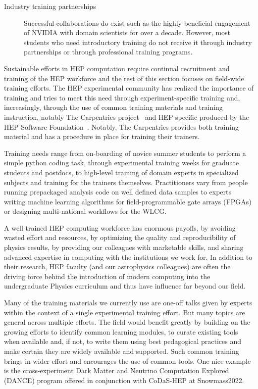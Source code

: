 \begin{description}
  \item [Industry training partnerships] Successful collaborations do exist such as the highly beneficial engagement of NVIDIA with domain scientists for over a decade.  However, most students who need introductory training do not receive it through industry partnerships or through professional training programs.   
\end{description}

\begin{comment}
    We need to make an effort to find the underlying challenges so that together we can address R\&D challenges in diverse teams. 
\end{comment}

Sustainable efforts in HEP computation require continual recruitment and training of  the HEP workforce and the rest of this section focuses on field-wide training efforts. The HEP experimental community has realized the importance of training and tries to meet this need through experiment-specific training and, increasingly, through the use of common training materials and training instruction, notably The Carpentries project~\cite{Carpentries} and HEP specific produced by the HEP Software Foundation~\cite{Malik_2021}.  Notably, The Carpentries provides both training material and has a procedure in place for training their trainers.

Training needs range from on-boarding of novice summer students to perform a simple python coding task, through experimental training weeks for graduate students and postdocs, to high-level training of domain experts in specialized subjects and training for the trainers themselves. Practitioners vary from people running prepackaged analysis code on well defined data samples to experts writing machine learning algorithms for field-programmable gate arrays (FPGAs) or designing multi-national workflows for the WLCG.  

A well trained HEP computing workforce has enormous payoffs, by avoiding wasted effort and resources, by optimizing the quality and reproducibility of physics results, by providing our colleagues with marketable skills, and sharing advanced expertise in computing with the institutions we work for.  In addition to their research, HEP faculty (and our astrophysics colleagues) are often the driving force behind the introduction of  modern computing into the undergraduate Physics curriculum and thus have influence far beyond our field.  

Many of the training materials we currently use are one-off talks given by experts within the context of a single experimental training effort.  But many topics are general across multiple efforts.  The field would benefit greatly by building on the growing efforts to identify common learning modules,  to curate existing tools when available and, if not, to write them using best pedagogical practices and make certain they are widely available and supported.    Such common training brings in wider effort and encourages the use of common tools.  One nice example is the cross-experiment Dark Matter and Neutrino Computation Explored (DANCE) program offered in conjunction  with CoDaS-HEP at  Snowmass2022.

